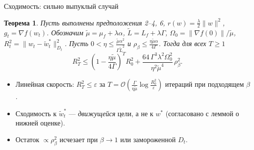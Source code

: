 \documentclass[aspectratio=169, 12pt]{beamer}
\newtheorem{theorem_rus}{Теорема}
\begin{document}
\begin{frame}{Сходимость: сильно выпуклый случай}
    \begin{theorem_rus}
    \label{theor:2}
    \small
    Пусть выполнены предположения 2--4, 6, $r(w) = \frac{\lambda}{2}\|w\|^2$, $g_t = \nabla f(w_t)$. Обозначим $\widetilde{\mu} = \mu_f + \lambda\alpha$, $\widetilde{L} = L_f + \lambda\Gamma$, $\Omega_0 = \|\nabla f(0)\|/\widetilde{\mu}$, $R_t^2 = \|w_t - \widetilde{w}^*_t\|^2_{D_t}$. Пусть
    $0 < \eta \le \frac{\widetilde{\mu}\alpha^2}{\Gamma \widetilde{L}^2}$ и $\rho_\beta \le \frac{\eta\widetilde{\mu}\alpha}{4\Gamma}$. Тогда для всех $T \ge 1$
    \vspace{-0.1cm}
    \begin{equation*}
        R_T^2 \le \left(1 - \frac{\eta\widetilde{\mu}}{4\Gamma}\right)^T R_0^2 + \frac{64\,\Gamma^3\lambda^2\Omega_0^2}{\eta^2\widetilde{\mu}^4}\,\rho_\beta^2 .
    \end{equation*}
\end{theorem_rus}
\begin{itemize}
    \small
    \item Линейная скорость: $R_T^2 \le \varepsilon$ за $T = \mathcal{O}\left(\frac{\Gamma}{\eta\widetilde{\mu}}\log\frac{R_0^2}{\varepsilon}\right)$ итераций при подходящем $\beta$.
    \item Сходимость к $\widetilde{w}^*_t$ --- \emph{движущейся} цели, а не к $w^*$ (согласовано с леммой о нижней оценке).
    \item Остаток $\propto \rho_\beta^2$ исчезает при $\beta \to 1$ или замороженной $D_t$.
\end{itemize}
\end{frame}
\end{document}
